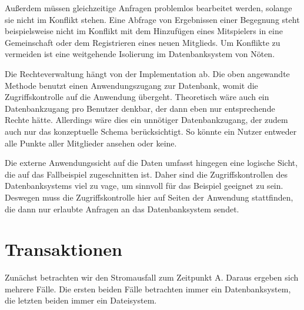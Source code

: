 \documentclass[ngerman]{gdb-aufgabenblatt}
\begin{document}
		Außerdem müssen gleichzeitige Anfragen problemlos bearbeitet werden, solange sie nicht im Konflikt stehen. Eine Abfrage von Ergebnissen einer Begegnung steht beispielsweise nicht im Konflikt mit dem Hinzufügen eines Mitspielers in eine Gemeinschaft oder dem Registrieren eines neuen Mitglieds. Um Konflikte zu vermeiden ist eine weitgehende Isolierung im Datenbanksystem von Nöten.
		
		Die Rechteverwaltung hängt von der Implementation ab. Die oben angewandte Methode benutzt einen Anwendungszugang zur Datenbank, womit die Zugriffskontrolle auf die Anwendung übergeht. Theoretisch wäre auch ein Datenbankzugang pro Benutzer denkbar, der dann eben nur entsprechende Rechte hätte. Allerdings wäre dies ein unnötiger Datenbankzugang, der zudem auch nur das konzeptuelle Schema berücksichtigt. So könnte ein Nutzer entweder alle Punkte aller Mitglieder ansehen oder keine. 
		
		Die externe Anwendungssicht auf die Daten umfasst hingegen eine logische Sicht, die auf das Fallbeispiel zugeschnitten ist. Daher sind die Zugriffskontrollen des Datenbanksystems viel zu vage, um sinnvoll für das Beispiel geeignet zu sein. Deswegen muss die Zugriffskontrolle hier auf Seiten der Anwendung stattfinden, die dann nur erlaubte Anfragen an das Datenbanksystem sendet.
		
		
\section{Transaktionen}
	Zunächst betrachten wir den Stromausfall zum Zeitpunkt A. Daraus ergeben sich mehrere Fälle. Die ersten beiden Fälle betrachten immer ein Datenbanksystem, die letzten beiden immer ein Dateisystem.
	
\end{document}
